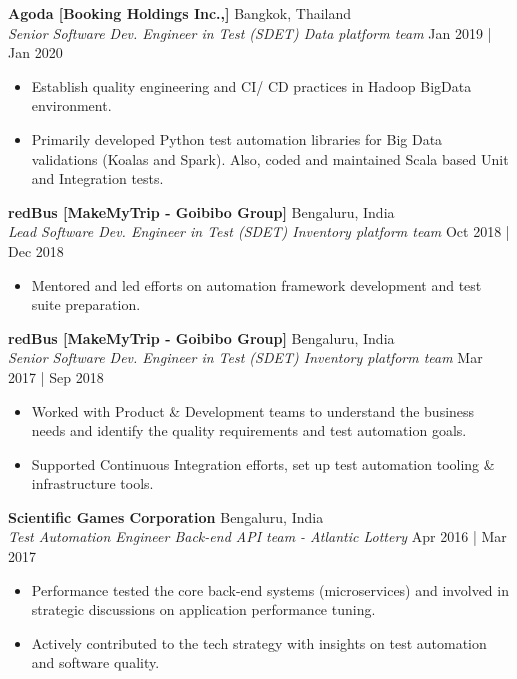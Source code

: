 \documentclass[a4paper]{article}
\begin{document}
\textbf{Agoda [Booking Holdings Inc.,]} \hfill Bangkok, Thailand\\
\textit{Senior Software Dev. Engineer in Test (SDET) \textbar{} Data platform team} \hfill Jan 2019 | Jan 2020\\
\vspace{-1.5mm}
\begin{itemize} \setlength\itemsep{-0.3em}
	\item Establish quality engineering and CI/ CD practices in Hadoop BigData environment.
	\item Primarily developed Python test automation libraries for Big Data validations (Koalas and Spark). Also, coded and maintained Scala based Unit and Integration tests.
\end{itemize}

\textbf{redBus [MakeMyTrip - Goibibo Group]} \hfill Bengaluru, India\\
\textit{Lead Software Dev. Engineer in Test (SDET) \textbar{} Inventory platform team} \hfill Oct 2018 | Dec 2018\\
\vspace{-1.5mm}
\begin{itemize} \setlength\itemsep{-0.3em}
	\item Mentored and led efforts on automation framework development and test suite preparation.
\end{itemize}

\textbf{redBus [MakeMyTrip - Goibibo Group]} \hfill Bengaluru, India\\
\textit{Senior Software Dev. Engineer in Test (SDET) \textbar{} Inventory platform team} \hfill Mar 2017 | Sep 2018\\
\vspace{-1.5mm}
\begin{itemize} \setlength\itemsep{-0.3em}
	\item Worked with Product \& Development teams to understand the business needs and identify the quality requirements and test automation goals.
	\item Supported Continuous Integration efforts, set up test automation tooling \& infrastructure tools.
\end{itemize}

\textbf{Scientific Games Corporation} \hfill Bengaluru, India\\
\textit{Test Automation Engineer \textbar{} Back-end API team - Atlantic Lottery} \hfill Apr 2016 | Mar 2017\\
\vspace{-1.5mm}
\begin{itemize} \setlength\itemsep{-0.3em}
	\item Performance tested the core back-end systems (microservices) and involved in strategic discussions on application performance tuning.
	\item Actively contributed to the tech strategy with insights on test automation and software quality.
\end{itemize}
\end{document}
